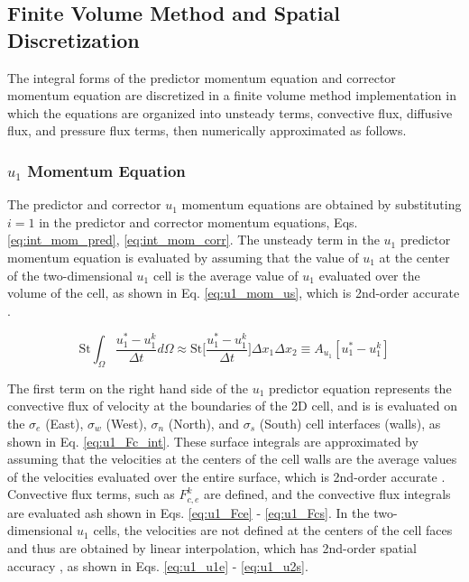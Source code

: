 \documentclass[10pt, letterpaper]{article}
\begin{document}
\subsection{Finite Volume Method and Spatial Discretization}

The integral forms of the predictor momentum equation and corrector momentum equation are discretized in a finite volume method implementation in which the equations are organized into unsteady terms, convective flux, diffusive flux, and pressure flux terms, then numerically approximated as follows.

\subsubsection{$u_{1}$ Momentum Equation}

The predictor and corrector $u_{1}$ momentum equations are obtained by substituting $i = 1$ in the predictor and corrector momentum equations, Eqs. \ref{eq:int_mom_pred}, \ref{eq:int_mom_corr}. The unsteady term in the $u_{1}$ predictor momentum equation is evaluated by assuming that the value of $u_{1}$ at the center of the two-dimensional $u_{1}$ cell is the average value of $u_{1}$ evaluated over the volume of the cell, as shown in Eq. \ref{eq:u1_mom_us}, which is 2nd-order accurate \cite{Ferziger_Springer_2002}.

\begin{equation}
  \text{St}\int_{\Omega}\frac{u_{1}^{*}-u_{1}^{k}}{\Delta{t}}d\Omega \approx
  \text{St}\bigg[\frac{u_{1}^{*}-u_{1}^{k}}{\Delta{t}}\bigg]\Delta{x_{1}}\Delta{x_{2}} \equiv
  A_{u_{1}}[u_{1}^{*} - u_{1}^{k}]
  \label{eq:u1_mom_us}  
\end{equation}

The first term on the right hand side of the $u_{1}$ predictor equation represents the convective flux of velocity at the boundaries of the 2D cell, and is is evaluated on the $\sigma_{e}$ (East), $\sigma_{w}$ (West), $\sigma_{n}$ (North), and $\sigma_{s}$ (South) cell interfaces (walls), as shown in Eq. \ref{eq:u1_Fc_int}. These surface integrals are approximated by assuming that the velocities at the centers of the cell walls are the average values of the velocities evaluated over the entire surface, which is 2nd-order accurate \cite{Ferziger_Springer_2002}. Convective flux terms, such as $F_{c,e}^{k}$ are defined, and the convective flux integrals are evaluated ash shown in Eqs. \ref{eq:u1_Fce} - \ref{eq:u1_Fcs}. In the two-dimensional $u_{1}$ cells, the velocities are not defined at the centers of the cell faces and thus are obtained by linear interpolation, which has 2nd-order spatial accuracy \cite{Ferziger_Springer_2002}, as shown in Eqs. \ref{eq:u1_u1e} - \ref{eq:u1_u2s}.
\end{document}
